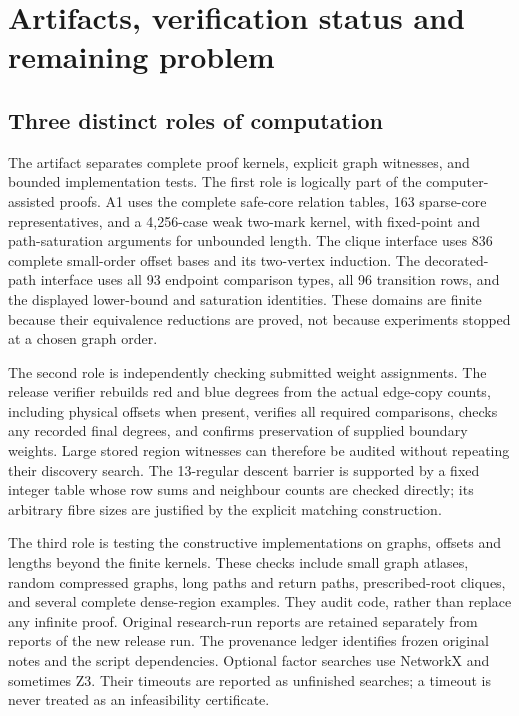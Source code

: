 \section{Artifacts, verification status and remaining problem}\label{sec:release}

\subsection{Three distinct roles of computation}

The artifact separates complete proof kernels, explicit graph witnesses,
and bounded implementation tests. The first role is logically part of
the computer-assisted proofs. A1 uses the complete safe-core relation
tables, 163 sparse-core representatives, and a 4,256-case weak two-mark
kernel, with fixed-point and path-saturation arguments for unbounded
length. The clique interface uses 836 complete small-order offset bases
and its two-vertex induction. The decorated-path interface uses all
93 endpoint comparison types, all 96 transition rows, and the displayed
lower-bound and saturation identities. These domains are finite because
their equivalence reductions are proved, not because experiments stopped
at a chosen graph order.

The second role is independently checking submitted weight assignments.
The release verifier rebuilds red and blue degrees from the actual
edge-copy counts, including physical offsets when present, verifies all
required comparisons, checks any recorded final degrees, and confirms
preservation of supplied boundary weights. Large stored region witnesses
can therefore be audited without repeating their discovery search.
The 13-regular descent barrier is supported by a fixed integer table
whose row sums and neighbour counts are checked directly; its arbitrary
fibre sizes are justified by the explicit matching construction.

The third role is testing the constructive implementations on graphs,
offsets and lengths beyond the finite kernels. These checks include
small graph atlases, random compressed graphs, long paths and return
paths, prescribed-root cliques, and several complete dense-region
examples. They audit code, rather than replace any infinite proof.
Original research-run reports are retained separately from reports of
the new release run. The provenance ledger identifies frozen original
notes and the script dependencies. Optional factor searches use
NetworkX and sometimes Z3. Their timeouts are reported as unfinished
searches; a timeout is never treated as an infeasibility certificate.

